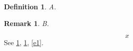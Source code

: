 \documentclass{article}
\newtheorem{definition}[equation]{Definition}
\newtheorem{remark}[definition]{Remark}
\begin{document}
\begin{definition}\label{d1} A. \end{definition}
\begin{remark}\label{r1} B. \end{remark}
\begin{equation}x\label{e1}\end{equation}
See \ref{d1}, \ref{r1}, \ref{e1}.
\end{document}
